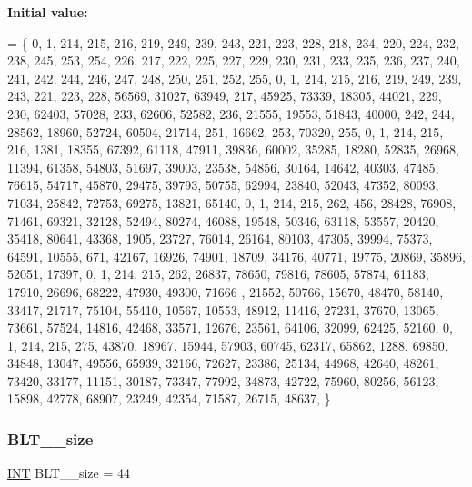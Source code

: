 {\bfseries Initial value\+:}
\begin{DoxyCode}
= \{
    0, 1, 214, 215, 216, 219, 249, 239, 243, 221, 223, 228, 218, 234, 220, 224, 232, 238, 245, 253, 254, 
      226, 217, 222, 225, 227, 229, 230, 231, 233, 235, 236, 237, 240, 241, 242, 244, 246, 247, 248, 250, 251, 252, 
      255, 
    0, 1, 214, 215, 216, 219, 249, 239, 243, 221, 223, 228, 56569, 31027, 63949, 217, 45925, 73339, 18305, 
      44021, 229, 230, 62403, 57028, 233, 62606, 52582, 236, 21555, 19553, 51843, 40000, 242, 244, 28562, 18960, 
      52724, 60504, 21714, 251, 16662, 253, 70320, 255, 
    0, 1, 214, 215, 216, 1381, 18355, 67392, 61118, 47911, 39836, 60002, 35285, 18280, 52835, 26968, 11394,
       61358, 54803, 51697, 39003, 23538, 54856, 30164, 14642, 40303, 47485, 76615, 54717, 45870, 29475, 39793, 
      50755, 62994, 23840, 52043, 47352, 80093, 71034, 25842, 72753, 69275, 13821, 65140, 
    0, 1, 214, 215, 262, 456, 28428, 76908, 71461, 69321, 32128, 52494, 80274, 46088, 19548, 50346, 63118, 
      53557, 20420, 35418, 80641, 43368, 1905, 23727, 76014, 26164, 80103, 47305, 39994, 75373, 64591, 10555, 671,
       42167, 16926, 74901, 18709, 34176, 40771, 19775, 20869, 35896, 52051, 17397, 
    0, 1, 214, 215, 262, 26837, 78650, 79816, 78605, 57874, 61183, 17910, 26696, 68222, 47930, 49300, 71666
      , 21552, 50766, 15670, 48470, 58140, 33417, 21717, 75104, 55410, 10567, 10553, 48912, 11416, 27231, 37670, 
      13065, 73661, 57524, 14816, 42468, 33571, 12676, 23561, 64106, 32099, 62425, 52160, 
    0, 1, 214, 215, 275, 43870, 18967, 15944, 57903, 60745, 62317, 65862, 1288, 69850, 34848, 13047, 49556,
       65939, 32166, 72627, 23386, 25134, 44968, 42640, 48261, 73420, 33177, 11151, 30187, 73347, 77992, 34873, 
      42722, 75960, 80256, 56123, 15898, 42778, 68907, 23249, 42354, 71587, 26715, 48637, 
\}
\end{DoxyCode}
\mbox{\label{data___b_l_t_8_c_a1a13d91f47f0f3fe827b2d0514123235}} 
\subsubsection{\texorpdfstring{B\+L\+T\+\_\+\_\+size}{BLT\_43\_size}}
{\footnotesize\ttfamily \mbox{\hyperlink{galois_8h_a09fddde158a3a20bd2dcadb609de11dc}{I\+NT}} B\+L\+T\+\_\+\_\+size = 44}

